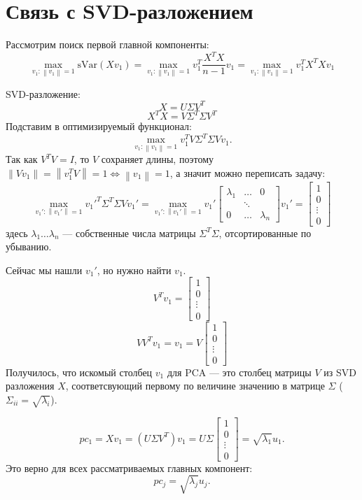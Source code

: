 \documentclass[12pt]{article} %
\theoremstyle{definition} %
\begin{document}
\section{Связь с SVD-разложением}
Рассмотрим поиск первой главной компоненты:
$$\max_{v_1: \left\| v_1 \right\| = 1} \text{sVar}(Xv_1)
= \max_{v_1: \left\| v_1 \right\| = 1} v_1^T \frac{X^TX}{n-1} v_1 =
\max_{v_1: \left\| v_1 \right\| = 1} v_1^T X^TX v_1 $$

SVD-разложение:
$$X = U\Sigma V^T$$
$$X^TX = V \Sigma^T \Sigma V^T$$
Подставим в оптимизируемый функционал:
$$ \max_{v_1: \left\| v_1 \right\| = 1} v_1^T V \Sigma^T \Sigma V v_1.$$
Так как $V^TV=I$, то $V$ сохраняет длины, поэтому
$\left\| Vv_1 \right\| = \left\| v_1^T V \right\| = 1 \iff \left\| v_1 \right\|=1$, а значит можно переписать задачу:
$$ \max_{v_1': \left\| v_1' \right\| = 1} v_1'^T \Sigma^T \Sigma V v_1'
=
\max_{v_1': \left\| v_1' \right\| = 1}
v_1'
\begin{bmatrix}
\lambda_1 & \dots & 0\\
& \ddots &\\
0 & \dots & \lambda_n
\end{bmatrix} v_1' =
\begin{bmatrix}
1\\
0\\
\vdots\\
0
\end{bmatrix}$$
здесь $\lambda_1 \dots \lambda_n$  —  собственные числа матрицы $\Sigma^T\Sigma$,
отсортированные по убыванию.

Сейчас мы нашли $v_1'$, но нужно найти $v_1$.
$$V^Tv_1 =
\begin{bmatrix}
1\\
0\\
\vdots\\
0
\end{bmatrix}$$
$$VV^Tv_1 = v_1 = V
\begin{bmatrix}
1\\
0\\
\vdots\\
0
\end{bmatrix}$$
Получилось, что искомый столбец $v_1$ для PCA  —  это столбец матрицы $V$ из SVD разложения $X$,
соответсвующий первому по величине значению в матрице $\Sigma$ ($\Sigma_{ii} = \sqrt{\lambda_i}$).

$$pc_1 = Xv_1 = (U\Sigma V^T)v_1 =
U \Sigma
\begin{bmatrix}
1\\
0\\
\vdots\\
0
\end{bmatrix}=
\sqrt{\lambda_1}u_1.
$$
Это верно для всех рассматриваемых главных компонент:
$$pc_j = \sqrt{\lambda_j} u_j.$$
\end{document}
